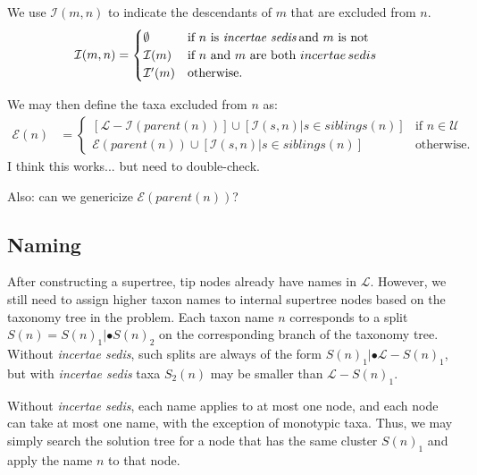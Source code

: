 \documentclass[english]{article}
\begin{document}
We use $\mathcal{I}(m,n)$ to indicate the descendants of $m$ that are
excluded from $n$.
\begin{align*} \mathcal{I}(m,n) & =\begin{cases}
\emptyset & \text{if }n\text{ is \emph{incertae sedis}\,and }m\text{
is not}\\ \mathcal{I}(m) & \text{if }n\text{ and }m\text{ are both
}incertae\,sedis\\ \mathcal{I}^{\prime}(m) & \text{otherwise.}
\end{cases} \end{align*}

We may then define the taxa excluded from $n$ as:
\begin{align*}
\mathcal{E}(n) & =\begin{cases}
\left[\mathcal{L}-\mathcal{I}(parent(n))\right]\cup[\mathcal{I}(s,n)|s\in siblings(n)] & \text{if }n\in\mathcal{U}\\
\mathcal{E}(parent(n))\cup[\mathcal{I}(s,n)|s\in siblings(n)] & \text{otherwise.}
\end{cases}
\end{align*}
I think this works...
but
need to double-check.

Also: can we genericize $\mathcal{E}(parent(n))$?

\subsection{Naming }

After constructing a supertree, tip nodes already have names in
\emph{$\mathcal{L}$}.
However, we still need to assign higher taxon
names to internal supertree nodes based on the taxonomy tree in the
problem.
Each taxon name $n$ corresponds to a split
$S(n)=S(n)_{1}|\bullet S(n)_{2}$ on the corresponding branch of the
taxonomy tree.
Without \emph{incertae sedis}, such splits are always
of the form $S(n)_{1}|\bullet\mathcal{L}-S(n)_{1}$, but with
\emph{incertae sedis} taxa $S_{2}(n)$ may be smaller than
$\mathcal{L}-S(n)_{1}$.

Without \emph{incertae sedis}, each name applies to at most one node,
and each node can take at most one name, with the exception of
monotypic taxa.
Thus, we may simply search the solution tree for a
node that has the same cluster $S(n)_{1}$ and apply the name $n$ to
that node.
\end{document}
